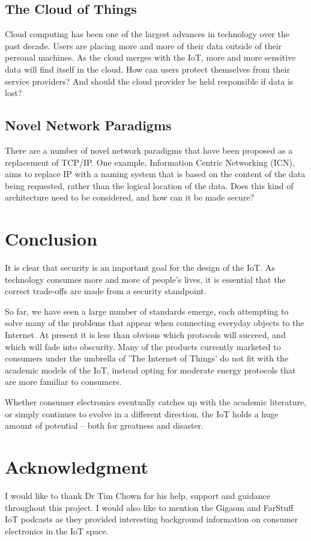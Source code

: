 \documentclass[10pt,journal,compsoc]{IEEEtran}
\begin{document}
\subsection{The Cloud of Things}
Cloud computing has been one of the largest advances in technology over the
past decade. Users are placing more and more of their data outside of their
personal machines. As the cloud merges with the IoT, more and more sensitive
data will find itself in the cloud. How can users protect themselves from their
service providers? And should the cloud provider be held responsible if data is
lost?

\subsection{Novel Network Paradigms}
There are a number of novel network paradigms that have been proposed as a
replacement of TCP/IP. One example, Information Centric Networking (ICN), aims
to replace IP with a naming system that is based on the content of the data
being requested, rather than the logical location of the data. Does this kind of
architecture need to be considered, and how can it be made secure?


\section{Conclusion}
It is clear that security is an important goal for the design of the IoT. As
technology consumes more and more of people's lives, it is essential that the
correct trade-offs are made from a security standpoint. 

So far, we have seen a large number of standards emerge, each attempting to
solve many of the problems that appear when connecting everyday objects to the
Internet. At present it is less than obvious which protocols will succeed, and
which will fade into obscurity. Many of the products currently marketed to
consumers under the umbrella of 'The Internet of Things' do not fit with the
academic models of the IoT, instead opting for moderate energy protocols that
are more familiar to consumers. 

Whether consumer electronics eventually catches up with the academic
literature, or simply continues to evolve in a different direction, the IoT
holds a huge amount of potential -- both for greatness and disaster.  


\section*{Acknowledgment}
I would like to thank Dr Tim Chown for his help, support and guidance
throughout this project. I would also like to mention the Gigaom and FarStuff
IoT podcasts as they provided interesting background information on consumer
electronics in the IoT space. 
\end{document}
